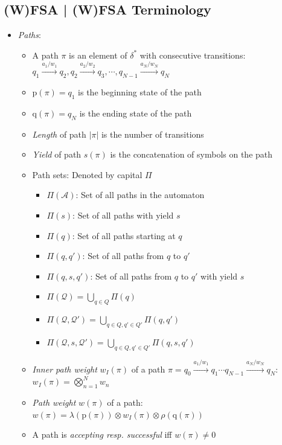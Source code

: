 \subsection*{(W)FSA | (W)FSA Terminology}
\begin{itemize}
    \item \emph{Paths}:
    \begin{itemize}
        \item A path $\pi$ is an element of $\delta^*$ with consecutive transitions:
        $
        q_1 \xrightarrow{a_1/w_1} q_2,q_2 \xrightarrow{a_2/w_2} q_3, \cdots, q_{N-1} \xrightarrow{a_N/w_N} q_N
        $
        \item $\textrm{p}(\pi) = q_1$ is the beginning state of the path
        \item $\textrm{q}(\pi) = q_N$ is the ending state of the path
        \item \emph{Length} of path $|\pi|$ is the number of transitions
        \item \emph{Yield} of path $s(\pi)$ is the concatenation of symbols on the path
        \item Path sets: Denoted by capital $\Pi$
        \begin{itemize}
            \item $\Pi(\mathcal{A})$: Set of all paths in the automaton
            \item $\Pi(s)$: Set of all paths with yield $s$
            \item $\Pi(q)$: Set of all paths starting at $q$
            \item $\Pi(q, q')$: Set of all paths from $q$ to $q'$
            \item $\Pi(q, s, q')$: Set of all paths from $q$ to $q'$ with yield $s$
            \item $\Pi(\mathcal{Q}) = \bigcup_{q \in Q} \Pi(q)$
            \item $\Pi(\mathcal{Q}, \mathcal{Q}') = \bigcup_{q \in Q, q' \in Q'} \Pi(q, q')$
            \item $\Pi(\mathcal{Q}, s, \mathcal{Q}') = \bigcup_{q \in Q, q' \in Q'} \Pi(q,s,q')$
        \end{itemize}
        \item \emph{Inner path weight} $w_I(\pi)$ of a path $\pi = q_0 \xrightarrow{a_1/w_1} q_1 \cdots q_{N-1} \xrightarrow{a_N/w_N} q_N$:
        $
        w_I(\pi) = \bigotimes_{n=1}^N w_n
        $
        \item \emph{Path weight} $w(\pi)$ of a path:
        $
        w(\pi) = \lambda(\textrm{p}(\pi)) \otimes w_I(\pi) \otimes \rho(\textrm{q}(\pi))
        $
        \item A path is \emph{accepting resp. successful} iff $w(\pi) \neq 0$
    \end{itemize}


\end{itemize}
